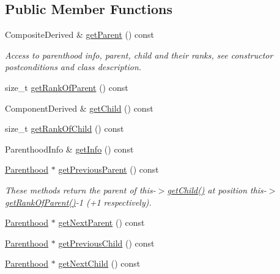\subsection*{Public Member Functions}
{\bf }\par
\begin{DoxyCompactItemize}
\item 
Composite\+Derived \& \hyperlink{classocra_1_1Parenthood_ac7e617fc08d7bed72fc6f90579b5cef7}{get\+Parent} () const
\begin{DoxyCompactList}\small\item\em Access to parenthood info, parent, child and their ranks, see constructor postconditions and class description. \end{DoxyCompactList}\item 
size\+\_\+t \hyperlink{classocra_1_1Parenthood_a82bb7a676d20350435a07b710de57052}{get\+Rank\+Of\+Parent} () const
\item 
Component\+Derived \& \hyperlink{classocra_1_1Parenthood_a7056661e3f0e6500141d305e6397f7c0}{get\+Child} () const
\item 
size\+\_\+t \hyperlink{classocra_1_1Parenthood_a51674187858154add6b9ca7d14110613}{get\+Rank\+Of\+Child} () const
\item 
Parenthood\+Info \& \hyperlink{classocra_1_1Parenthood_a3f3dc26c36363b7b968a7d0a26bc71a5}{get\+Info} () const
\end{DoxyCompactItemize}

{\bf }\par
\begin{DoxyCompactItemize}
\item 
\hyperlink{classocra_1_1Parenthood}{Parenthood} $\ast$ \hyperlink{classocra_1_1Parenthood_a541a735ce9bca816dde36abc3625c7cc}{get\+Previous\+Parent} () const
\begin{DoxyCompactList}\small\item\em These methods return the parent of this-\/$>$\hyperlink{classocra_1_1Parenthood_a7056661e3f0e6500141d305e6397f7c0}{get\+Child()} at position this-\/$>$\hyperlink{classocra_1_1Parenthood_a82bb7a676d20350435a07b710de57052}{get\+Rank\+Of\+Parent()}-\/1 (+1 respectively). \end{DoxyCompactList}\item 
\hyperlink{classocra_1_1Parenthood}{Parenthood} $\ast$ \hyperlink{classocra_1_1Parenthood_a550aeaefe0b5901a98e3fb7ca4d4eb9c}{get\+Next\+Parent} () const
\end{DoxyCompactItemize}

{\bf }\par
\begin{DoxyCompactItemize}
\item 
\hyperlink{classocra_1_1Parenthood}{Parenthood} $\ast$ \hyperlink{classocra_1_1Parenthood_a701292fd986632d0ec5c54f783db04ea}{get\+Previous\+Child} () const
\item 
\hyperlink{classocra_1_1Parenthood}{Parenthood} $\ast$ \hyperlink{classocra_1_1Parenthood_a3a39b83562da1e72067ae98934c4d119}{get\+Next\+Child} () const
\end{DoxyCompactItemize}

